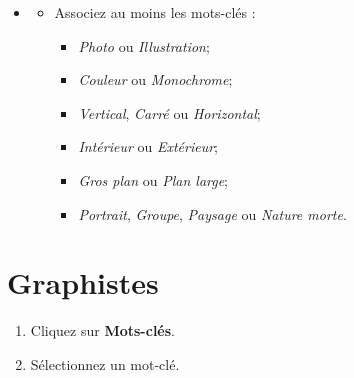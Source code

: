\documentclass[12pt,nofoldmark,notumble]{leaflet}
\begin{document}
\begin{itemize}
  \item[]
  \begin{itemize}
  \item Associez au moins les mots-clés :

    \begin{itemize}
    \item \emph{Photo} ou \emph{Illustration};
    \item \emph{Couleur} ou \emph{Monochrome};
    \item \emph{Vertical}, \emph{Carré} ou \emph{Horizontal};
    \item \emph{Intérieur} ou \emph{Extérieur};
    \item \emph{Gros plan} ou \emph{Plan large};
    \item \emph{Portrait}, \emph{Groupe}, \emph{Paysage} ou \emph{Nature morte}.
    \end{itemize}
  \end{itemize}
\end{itemize}
\vspace*{\fill}


\clearpage

\section{\faPaintBrush Graphistes}

\vspace*{\fill}

\begin{enumerate}[itemsep=0mm,leftmargin=*]

\item Cliquez sur \textbf{Mots-clés}.
\item Sélectionnez un mot-clé.
\end{enumerate}
\begin{center}
  \setlength{\fboxsep}{0pt}%
  \setlength{\fboxrule}{0pt}%
\end{center}
\end{document}
